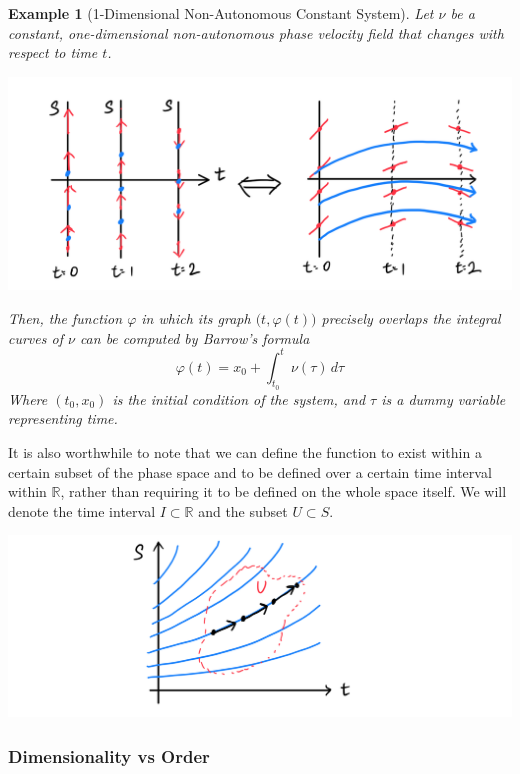 \documentclass{article}
\newtheorem{example}{Example}[section]
\theoremstyle{remark}
\theoremstyle{definition}
\begin{document}
\begin{example}[1-Dimensional Non-Autonomous Constant System]
Let $\nu$ be a constant, one-dimensional non-autonomous phase velocity field that changes with respect to time $t$. 
\begin{center}
    \includegraphics[scale=0.25]{img/Nonauto_constant_field.PNG}
\end{center}
Then, the function $\varphi$ in which its graph $\big( t, \varphi(t)\big)$ precisely overlaps the integral curves of $\nu$ can be computed by \textit{Barrow's formula}
\[\varphi(t) = x_0 + \int_{t_0}^t \nu(\tau)\, d\tau\]
Where $(t_0, x_0)$ is the initial condition of the system, and $\tau$ is a dummy variable representing time. 
\end{example}

It is also worthwhile to note that we can define the function to exist within a certain subset of the phase space and to be defined over a certain time interval within $\mathbb{R}$, rather than requiring it to be defined on the whole space itself. We will denote the time interval $I \subset \mathbb{R}$ and the subset $U \subset S$. 
\begin{center}
    \includegraphics[scale=0.25]{img/ODE_in_open_set.PNG}
\end{center}

\subsubsection{Dimensionality vs Order}
\end{document}

